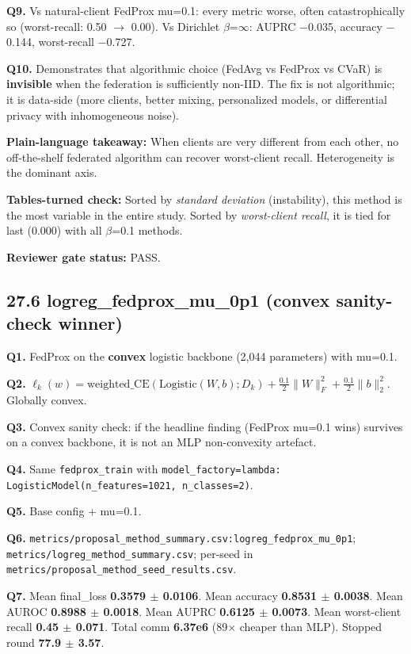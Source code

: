 \documentclass{article}
\begin{document}
\textbf{Q9.} Vs natural-client FedProx mu=0.1: every metric worse, often catastrophically so (worst-recall: 0.50 \ensuremath{\rightarrow} 0.00). Vs Dirichlet \ensuremath{\beta}=\ensuremath{\infty}: AUPRC \ensuremath{-}0.035, accuracy \ensuremath{-}0.144, worst-recall \ensuremath{-}0.727.


\textbf{Q10.} Demonstrates that algorithmic choice (FedAvg vs FedProx vs CVaR) is \textbf{invisible} when the federation is sufficiently non-IID. The fix is not algorithmic; it is data-side (more clients, better mixing, personalized models, or differential privacy with inhomogeneous noise).


\textbf{Plain-language takeaway:} When clients are very different from each other, no off-the-shelf federated algorithm can recover worst-client recall. Heterogeneity is the dominant axis.


\textbf{Tables-turned check:} Sorted by \emph{standard deviation} (instability), this method is the most variable in the entire study. Sorted by \emph{worst-client recall}, it is tied for last (0.000) with all \ensuremath{\beta}=0.1 methods.


\textbf{Reviewer gate status:} PASS.


\subsection{27.6 logreg\_fedprox\_mu\_0p1 (convex sanity-check winner)}


\textbf{Q1.} FedProx on the \textbf{convex} logistic backbone (2,044 parameters) with mu=0.1.


\textbf{Q2.} \(\ell_k(w) = \text{weighted\_CE}(\text{Logistic}(W, b); D_k) + \frac{0.1}{2} \|W\|_F^2 + \frac{0.1}{2} \|b\|_2^2\). Globally convex.


\textbf{Q3.} Convex sanity check: if the headline finding (FedProx mu=0.1 wins) survives on a convex backbone, it is not an MLP non-convexity artefact.


\textbf{Q4.} Same \texttt{fedprox\_train} with \texttt{model\_factory=lambda: LogisticModel(n\_features=1021, n\_classes=2)}.


\textbf{Q5.} Base config + mu=0.1.


\textbf{Q6.} \texttt{metrics/proposal\_method\_summary.csv:logreg\_fedprox\_mu\_0p1}; \texttt{metrics/logreg\_method\_summary.csv}; per-seed in \texttt{metrics/proposal\_method\_seed\_results.csv}.


\textbf{Q7.} Mean final\_loss \textbf{0.3579 \ensuremath{\pm} 0.0106}. Mean accuracy \textbf{0.8531 \ensuremath{\pm} 0.0038}. Mean AUROC \textbf{0.8988 \ensuremath{\pm} 0.0018}. Mean AUPRC \textbf{0.6125 \ensuremath{\pm} 0.0073}. Mean worst-client recall \textbf{0.45 \ensuremath{\pm} 0.071}. Total comm \textbf{6.37e6} (89\ensuremath{\times} cheaper than MLP). Stopped round \textbf{77.9 \ensuremath{\pm} 3.57}.
\end{document}
